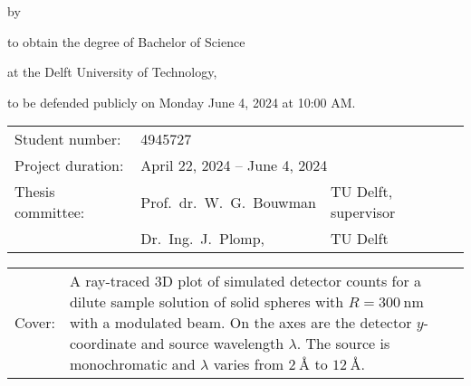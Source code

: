 \begin{titlepage}

\begin{center}

{\makeatletter
\largetitlestyle\fontsize{45}{45}\selectfont\@title
\makeatother}

{\makeatletter
\ifdefvoid{\@subtitle}{}{\bigskip\titlestyle\fontsize{20}{20}\selectfont\@subtitle}
\makeatother}

\bigskip
\bigskip

by

\bigskip
\bigskip

{\makeatletter
\largetitlestyle\fontsize{25}{25}\selectfont\@author
\makeatother}

\bigskip
\bigskip

to obtain the degree of Bachelor of Science

at the Delft University of Technology,

to be defended publicly on Monday June 4, 2024 at 10:00 AM.

\vfill

\begin{tabular}{lll}
    Student number: & 4945727 \\
    Project duration: & \multicolumn{2}{l}{April 22, 2024 -- June 4, 2024} \\
    Thesis committee: & Prof.\ dr.\ W.\ G.\ Bouwman & TU Delft, supervisor \\
        & Dr.\ Ing.\ J.\ Plomp, & TU Delft
\end{tabular}

\bigskip
\bigskip

\bigskip
\bigskip
\begin{tabular}{p{15mm}p{10cm}}
			Cover: & A ray-traced 3D plot of simulated detector counts for a dilute sample solution of solid spheres with $R = \SI{300}{\nano\meter}$ with a modulated beam. On the axes are the detector $y$-coordinate and source wavelength $\lambda$. The source is monochromatic and $\lambda$ varies from $\SI{2}{\angstrom}$ to $\SI{12}{\angstrom}$.\\
\end{tabular}


\end{center}
\end{titlepage}
